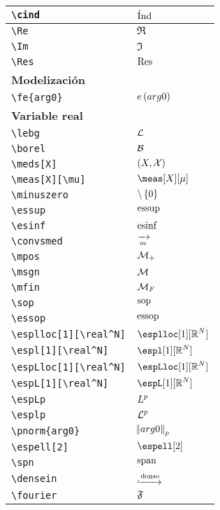 \begin{longtable}{|p{3.5cm}|p{2cm}|}
\verb|\cind| & $\displaystyle\cind$ \\ \midrule 
\verb|\Re| & $\displaystyle\Re$ \\ \midrule 
\verb|\Im| & $\displaystyle\Im$ \\ \midrule 
\verb|\Res| & $\displaystyle\Res$ \\ \midrule 
\bottomrule \multicolumn{2}{|p{5.5cm}|}{\textbf{Modelización}} \\ \toprule 
\verb|\fe{arg0}| & $\displaystyle\fe{arg0}$ \\ \midrule 
\bottomrule \multicolumn{2}{|p{5.5cm}|}{\textbf{Variable real}} \\ \toprule 
\verb|\lebg| & $\displaystyle\lebg$ \\ \midrule 
\verb|\borel| & $\displaystyle\borel$ \\ \midrule 
\verb|\meds[X]| & $\displaystyle\meds[X]$ \\ \midrule 
\verb|\meas[X][\mu]| & $\displaystyle\meas[X][\mu]$ \\ \midrule 
\verb|\minuszero| & $\displaystyle\minuszero$ \\ \midrule 
\verb|\essup| & $\displaystyle\essup$ \\ \midrule 
\verb|\esinf| & $\displaystyle\esinf$ \\ \midrule 
\verb|\convsmed| & $\displaystyle\convsmed$ \\ \midrule 
\verb|\mpos| & $\displaystyle\mpos$ \\ \midrule 
\verb|\msgn| & $\displaystyle\msgn$ \\ \midrule 
\verb|\mfin| & $\displaystyle\mfin$ \\ \midrule 
\verb|\sop| & $\displaystyle\sop$ \\ \midrule 
\verb|\essop| & $\displaystyle\essop$ \\ \midrule 
\verb|\esplloc[1][\real^N]| & $\displaystyle\esplloc[1][\real^N]$ \\ \midrule 
\verb|\espl[1][\real^N]| & $\displaystyle\espl[1][\real^N]$ \\ \midrule 
\verb|\espLloc[1][\real^N]| & $\displaystyle\espLloc[1][\real^N]$ \\ \midrule 
\verb|\espL[1][\real^N]| & $\displaystyle\espL[1][\real^N]$ \\ \midrule 
\verb|\espLp| & $\displaystyle\espLp$ \\ \midrule 
\verb|\esplp| & $\displaystyle\esplp$ \\ \midrule 
\verb|\pnorm{arg0}| & $\displaystyle\pnorm{arg0}$ \\ \midrule 
\verb|\espell[2]| & $\displaystyle\espell[2]$ \\ \midrule 
\verb|\spn| & $\displaystyle\spn$ \\ \midrule 
\verb|\densein| & $\displaystyle\densein$ \\ \midrule 
\verb|\fourier| & $\displaystyle\fourier$ \\ \midrule 
\end{longtable}